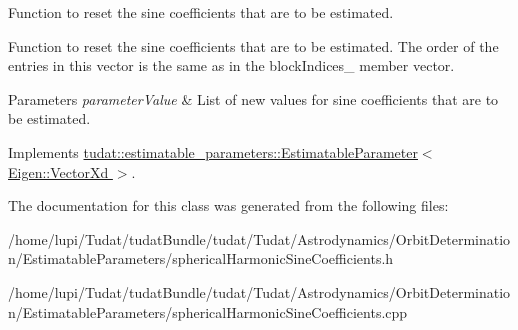 Function to reset the sine coefficients that are to be estimated. 

Function to reset the sine coefficients that are to be estimated. The order of the entries in this vector is the same as in the block\+Indices\+\_\+ member vector. 
\begin{DoxyParams}{Parameters}
{\em parameter\+Value} & List of new values for sine coefficients that are to be estimated. \\
\hline
\end{DoxyParams}


Implements \hyperlink{classtudat_1_1estimatable__parameters_1_1EstimatableParameter_a5df35bde257a6db401ca3c3613056554}{tudat\+::estimatable\+\_\+parameters\+::\+Estimatable\+Parameter$<$ Eigen\+::\+Vector\+Xd $>$}.



The documentation for this class was generated from the following files\+:\begin{DoxyCompactItemize}
\item 
/home/lupi/\+Tudat/tudat\+Bundle/tudat/\+Tudat/\+Astrodynamics/\+Orbit\+Determination/\+Estimatable\+Parameters/spherical\+Harmonic\+Sine\+Coefficients.\+h\item 
/home/lupi/\+Tudat/tudat\+Bundle/tudat/\+Tudat/\+Astrodynamics/\+Orbit\+Determination/\+Estimatable\+Parameters/spherical\+Harmonic\+Sine\+Coefficients.\+cpp\end{DoxyCompactItemize}

